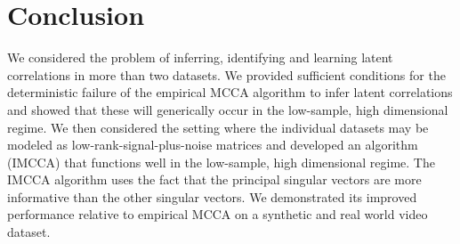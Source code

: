 \section{Conclusion}

We considered the problem of inferring, identifying and learning latent
correlations in more than two datasets.  We provided sufficient conditions for
the deterministic failure of the empirical MCCA algorithm to infer latent correlations and
showed that these will generically occur in the low-sample, high dimensional regime. We
then considered the setting where the individual datasets may be modeled as
low-rank-signal-plus-noise matrices and developed an algorithm (IMCCA) that functions well
in the low-sample, high dimensional regime. The IMCCA algorithm uses the fact that the
principal singular vectors are more informative than the other singular vectors. We
demonstrated its improved performance relative to empirical MCCA on a synthetic and real
world video dataset.
